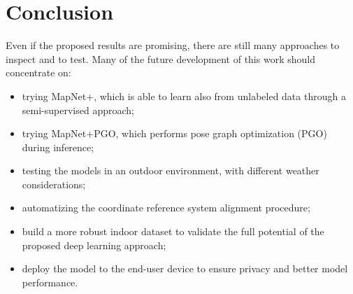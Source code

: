 \section{Conclusion}


Even if the proposed results are promising, there are still many approaches to inspect and to test.
Many of the future development of this work should concentrate on:
\begin{itemize}
    \item trying MapNet+, which is able to learn also from unlabeled data through a semi-supervised approach;
    \item trying MapNet+PGO, which performs pose graph optimization (PGO) during inference;
    \item testing the models in an outdoor environment, with different weather considerations;
    \item automatizing the coordinate reference system alignment procedure;
    \item build a more robust indoor dataset to validate the full potential of the proposed deep learning approach;
    \item deploy the model to the end-user device to ensure privacy and better model performance.
\end{itemize}